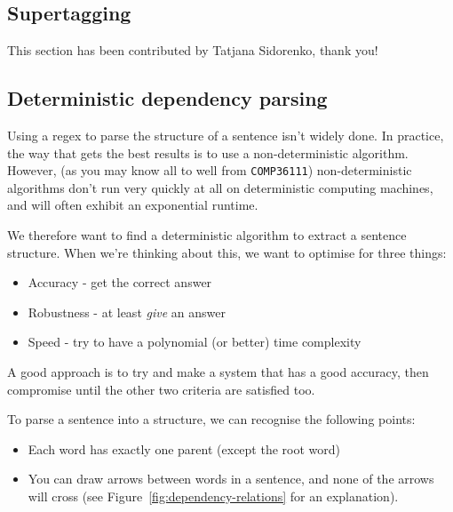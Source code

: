 \subsection{Supertagging}

This section has been contributed by Tatjana Sidorenko, thank you!



\subsection{Deterministic dependency parsing}

Using a regex to parse the structure of a sentence isn't widely done. In
practice, the way that gets the best results is to use a non-deterministic
algorithm. However, (as you may know all to well from \texttt{COMP36111})
non-deterministic algorithms don't run very quickly at all on deterministic
computing machines, and will often exhibit an exponential runtime.

We therefore want to find a deterministic algorithm to extract a sentence
structure. When we're thinking about this, we want to optimise for three things:

\begin{itemize}
  \item Accuracy - get the correct answer
  \item Robustness - at least \textit{give} an answer
  \item Speed - try to have a polynomial (or better) time complexity
\end{itemize}

A good approach is to try and make a system that has a good accuracy, then
compromise until the other two criteria are satisfied too.

To parse a sentence into a structure, we can recognise the following points:

\begin{itemize}
  \item Each word has exactly one parent (except the root word)
  \item You can draw arrows between words in a sentence, and none of the arrows 
  will cross (see Figure~\ref{fig:dependency-relations} for an explanation).
\end{itemize}

